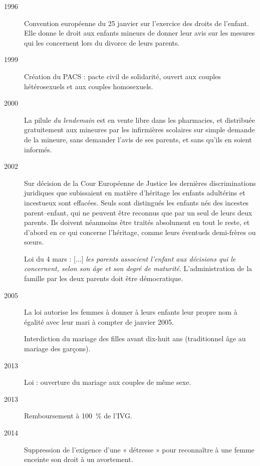 \begin{description}
\item[1996] Convention européenne du 25 janvier sur l'exercice des droits de l'enfant. Elle donne le droit aux enfants mineurs de donner leur avis sur les mesures qui les concernent lors du divorce de leurs parents.

\item[1999] Création du PACS : pacte civil de solidarité, ouvert aux couples hétérosexuels et aux couples homosexuels.

\item[2000] La pilule {\emph{du lendemain}} est en vente libre dans les pharmacies, et distribuée gratuitement aux mineures par les infirmières scolaires sur simple demande de la mineure, sans demander l'avis de ses parents, et sans qu'ils en soient informés.

\item[2002] Sur décision de la Cour Européenne de Justice les dernières discriminations juridiques que subissaient en matière d'héritage les enfants adultérins et incestueux sont effacées. Seuls sont distingués les enfants nés des incestes parent--enfant, qui ne peuvent être reconnus que par un seul de leurs deux parents. Ils doivent néanmoins être traités absolument en tout le reste, et d'abord en ce qui concerne l'héritage, comme leurs éventuels demi-frères ou sœurs. 

Loi du 4 mars : {[...] \emph{les parents associent l'enfant aux décisions qui le concernent, selon son âge et son degré de maturité}}. L'administration de la famille par les deux parents doit être démocratique.

\item[2005] La loi autorise les femmes à donner à leurs enfants leur propre nom à égalité avec leur mari à compter de janvier 2005. 

Interdiction du mariage des filles avant dix-huit ans (traditionnel âge au mariage des garçons).

\item[2013] Loi  : ouverture du mariage aux couples de même sexe.

\item[2013] Remboursement à 100~\% de l'IVG.

\item[2014] Suppression de l'exigence d'une « détresse » pour reconnaître à une femme enceinte son droit à un avortement. 
\end{description}
 
